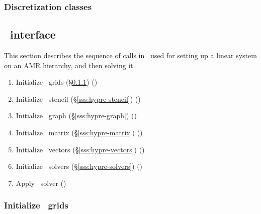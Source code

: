 \documentclass[10pt]{article}
\begin{document}
\subsubsection{Discretization classes}



\subsection{\hypre\ interface}

This section describes the sequence of calls in \hypre\ used for
setting up a linear system on an AMR hierarchy, and then solving it.

\begin{enumerate}
\item Initialize \hypre\ grids (\S\ref{sss:hypre-grids}) ()
\item Initialize \hypre\ stencil (\S\ref{sss:hypre-stencil}) ()
\item Initialize \hypre\ graph (\S\ref{sss:hypre-graph}) ()
\item Initialize \hypre\ matrix (\S\ref{sss:hypre-matrix}) ()
\item Initialize \hypre\ vectors (\S\ref{sss:hypre-vectors}) ()
\item Initialize \hypre\ solvers (\S\ref{sss:hypre-solvers}) ()
\item Apply \hypre\ solver ()
\end{enumerate}

\subsubsection{Initialize \hypre\ grids} \label{sss:hypre-grids}
\end{document}
